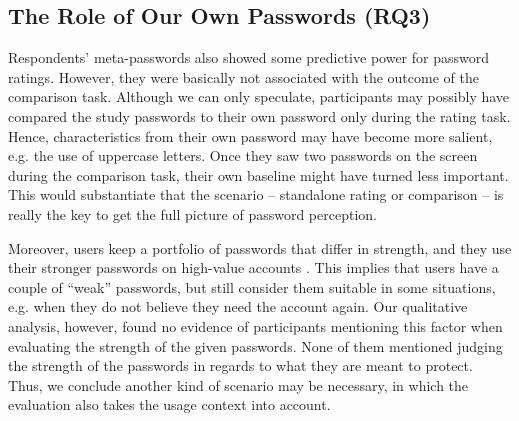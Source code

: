 \subsection{The Role of Our Own Passwords (RQ3)}
Respondents' meta-passwords also showed some predictive power for password ratings. However, they were basically not associated with the outcome of the comparison task. %
Although we can only speculate, participants may possibly have compared the study passwords to their own password only during the rating task. Hence, characteristics from their own password may have become more salient, e.g. the use of uppercase letters. Once they saw two passwords on the screen during the comparison task, their own baseline might have turned less important. This would substantiate that the scenario -- standalone rating or comparison -- is really the key to get the full picture of password perception. %

Moreover, users keep a portfolio of passwords that differ in strength, and they use their stronger passwords on high-value accounts \cite{Egelman2013DoesMyPasswordGoUpToEleven,Florencio2007LargeScaleStudyPasswordHabits}. This implies that users have a couple of ``weak'' passwords, but still consider them suitable in some situations, e.g. when they do not believe they need the account again. Our qualitative analysis, however, found no evidence of participants mentioning this factor when evaluating the strength of the given passwords. None of them mentioned judging the strength of the passwords in regards to what they are meant to protect. Thus, we conclude another kind of scenario may be necessary, in which the evaluation also takes the usage context into account.






